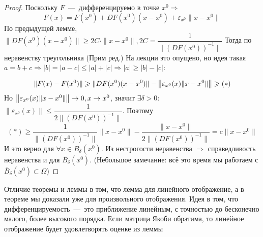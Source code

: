 \begin{proof}
    Поскольку $F$~---~дифференцируемо в точке $x^0 \Rightarrow$
    \[F(x) = F(x^0) + DF(x^0)(x - x^0) + \varepsilon_{x^0}\|x - x^0\|\]
    По предыдущей лемме, $ \|DF(x^0)(x - x^0)\| \geq 2C \cdot \|x - x^0\|, 2C = \dfrac{1}{\|(DF(x^0))^{-1}\|}$
    Тогда по неравенству треугольника
    (Прим ред.) На лекции это опущено, но идея такая $a = b + c \Longrightarrow |b| = |a - c| \leq |a| + |c| \Longrightarrow |a| \geq |b| - |c|$:
    
    \[\|F(x) - F(x^0)\| \geq \|DF(x^0)(x - x^0)\| - \big{\|} \varepsilon_{x^0}(x)\|x - x^0\|\big{\|} \geq (*)\]
    Но $\big{\|} \varepsilon_{x^0}(x)\| x - x^0 \| \big{\|} \rightarrow 0, x \rightarrow x^0$, значит $\exists \delta > 0$: $\|\varepsilon_{x^0}(x) \| \leq \dfrac{1}{2\|(DF(x^0))^{-1}\|}$. Поэтому
    \[(*) \geq \dfrac{1}{\|(DF(x^0))^{-1}\|} \|x - x^0 \| - \dfrac{\|x - x^0\|}{2\|(DF(x^0))^{-1}\|} = c\|x - x^0\|\]
    И это верно для $\forall x \in B_\delta(x^0)$. Из нестрогости неравенства $\Rightarrow$ справедливость неравенства и для $\overline{B}_\delta(x^0)$. (Небольшое замечание: всё это время мы работаем с $\overline{B}_\delta(x^0) \subset \Omega$)
\end{proof}

\begin{note}
    Отличие теоремы и леммы в том, что лемма для линейного отображение, а в теореме мы доказали уже для произвольного отображения. Идея в том, что дифференцируемость~---~это приближение линейным, с точностью до бесконечно малого, более высокого порядка. Если матрица Якоби обратима, то линейное отображение будет удовлетворять оценке из леммы
\end{note}


